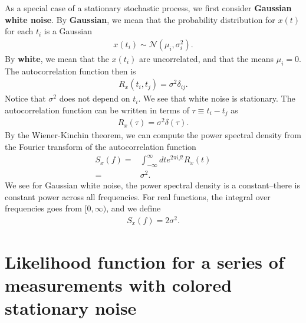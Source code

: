 As a special case of a stationary stochastic process, 
we first consider \textbf{Gaussian white noise}. 
By \textbf{Gaussian}, we mean that the probability distribution for 
$x\left(t\right)$ for each $t_i$ is a Gaussian 
\begin{align}
    x\left(t_i\right) \sim \mathcal{N}\left(\mu_i,\sigma_i^2\right)
    .
\end{align}
By \textbf{white}, we mean that the $x\left(t_i\right)$ are uncorrelated, 
and that the means $\mu_i=0$.
The autocorrelation function then is 
\begin{align}
    \label{eq:autocorrelation-white-noise}
    R_{x}\left(t_i,t_j\right)
    =
    \sigma^2 \delta_{ij}
    .
\end{align}
Notice that $\sigma^2$ does not depend on $t_i$. 
We see that white noise is stationary.
The autocorrelation function can be written in terms of $\tau \equiv t_i-t_j$ as
\begin{align}
    \label{eq:autocorrelation-white-noise}
    R_{x}\left(\tau\right) = \sigma^2 \delta\left(\tau\right) 
    .
\end{align}
By the Wiener-Kinchin theorem, we can compute the power spectral density from
the Fourier transform of the autocorrelation function
\begin{align}
    S_{x}\left(f\right)
    =&
    \int_{-\infty}^{\infty} dt e^{2\pi i f t}R_{x}\left(t\right)
    \nonumber\\
    =&
    \sigma^2
    .
\end{align}
We see for Gaussian white noise, the power spectral density is a constant--there
is constant power across all frequencies.
For real functions, the integral over frequencies goes from $[0,\infty)$,
and we define
\begin{align}
    S_x\left(f\right)
    =
    2\sigma^2 
    .
\end{align}

\section{Likelihood function for a series of measurements with colored stationary noise
\label{sec:likelihood-function-colored-noise}}


